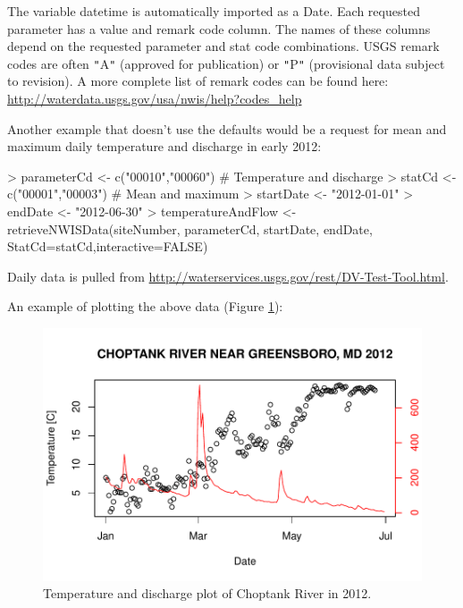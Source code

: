 \documentclass[a4paper,11pt]{article}
\begin{document}
The variable datetime is automatically imported as a Date. Each requested parameter has a value and remark code column.  The names of these columns depend on the requested parameter and stat code combinations. USGS remark codes are often \texttt{"}A\texttt{"} (approved for publication) or \texttt{"}P\texttt{"} (provisional data subject to revision). A more complete list of remark codes can be found here:
\url{http://waterdata.usgs.gov/usa/nwis/help?codes_help}

Another example that doesn't use the defaults would be a request for mean and maximum daily temperature and discharge in early 2012:
\begin{Schunk}
\begin{Sinput}
> parameterCd <- c("00010","00060")  # Temperature and discharge
> statCd <- c("00001","00003")  # Mean and maximum
> startDate <- "2012-01-01"
> endDate <- "2012-06-30"
> temperatureAndFlow <- retrieveNWISData(siteNumber, parameterCd, 
         startDate, endDate, StatCd=statCd,interactive=FALSE)
\end{Sinput}
\end{Schunk}

Daily data is pulled from \url{http://waterservices.usgs.gov/rest/DV-Test-Tool.html}. 

An example of plotting the above data (Figure \ref{fig:TD}):

\begin{Schunk}
\end{Schunk}


\begin{figure}
\begin{center}
\includegraphics{dataRetrieval-fig1}
\end{center}
\caption{Temperature and discharge plot of Choptank River in 2012.}
\label{fig:TD}
\end{figure}
\end{document}
